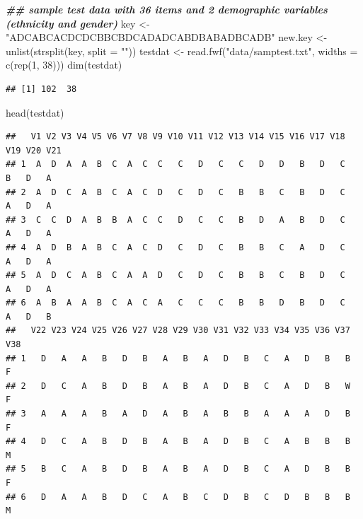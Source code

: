 \documentclass[
]{book}
\newenvironment{Shaded}{\begin{snugshade}}{\end{snugshade}}
\newcommand{\AttributeTok}[1]{\textcolor[rgb]{0.77,0.63,0.00}{#1}}
\newcommand{\DecValTok}[1]{\textcolor[rgb]{0.00,0.00,0.81}{#1}}
\newcommand{\DocumentationTok}[1]{\textcolor[rgb]{0.56,0.35,0.01}{\textbf{\textit{#1}}}}
\newcommand{\FunctionTok}[1]{\textcolor[rgb]{0.00,0.00,0.00}{#1}}
\newcommand{\NormalTok}[1]{#1}
\newcommand{\OtherTok}[1]{\textcolor[rgb]{0.56,0.35,0.01}{#1}}
\newcommand{\StringTok}[1]{\textcolor[rgb]{0.31,0.60,0.02}{#1}}
\begin{document}
\begin{Shaded}
\begin{Highlighting}[]
\DocumentationTok{\#\# sample test data with 36 items and 2 demographic variables (ethnicity and gender)}
\NormalTok{key }\OtherTok{\textless{}{-}} \StringTok{"ADCABCACDCDCBBCBDCADADCABDBABADBCADB"}
\NormalTok{new.key }\OtherTok{\textless{}{-}} \FunctionTok{unlist}\NormalTok{(}\FunctionTok{strsplit}\NormalTok{(key, }\AttributeTok{split =} \StringTok{""}\NormalTok{))}
\NormalTok{testdat }\OtherTok{\textless{}{-}} \FunctionTok{read.fwf}\NormalTok{(}\StringTok{"data/samptest.txt"}\NormalTok{, }\AttributeTok{widths =} \FunctionTok{c}\NormalTok{(}\FunctionTok{rep}\NormalTok{(}\DecValTok{1}\NormalTok{, }\DecValTok{38}\NormalTok{)))}
\FunctionTok{dim}\NormalTok{(testdat)}
\end{Highlighting}
\end{Shaded}

\begin{verbatim}
## [1] 102  38
\end{verbatim}

\begin{Shaded}
\begin{Highlighting}[]
\FunctionTok{head}\NormalTok{(testdat)}
\end{Highlighting}
\end{Shaded}

\begin{verbatim}
##   V1 V2 V3 V4 V5 V6 V7 V8 V9 V10 V11 V12 V13 V14 V15 V16 V17 V18 V19 V20 V21
## 1  A  D  A  A  B  C  A  C  C   C   D   C   C   D   D   B   D   C   B   D   A
## 2  A  D  C  A  B  C  A  C  D   C   D   C   B   B   C   B   D   C   A   D   A
## 3  C  C  D  A  B  B  A  C  C   D   C   C   B   D   A   B   D   C   A   D   A
## 4  A  D  B  A  B  C  A  C  D   C   D   C   B   B   C   A   D   C   A   D   A
## 5  A  D  C  A  B  C  A  A  D   C   D   C   B   B   C   B   D   C   A   D   A
## 6  A  B  A  A  B  C  A  C  A   C   C   C   B   B   D   B   D   C   A   D   B
##   V22 V23 V24 V25 V26 V27 V28 V29 V30 V31 V32 V33 V34 V35 V36 V37 V38
## 1   D   A   A   B   D   B   A   B   A   D   B   C   A   D   B   B   F
## 2   D   C   A   B   D   B   A   B   A   D   B   C   A   D   B   W   F
## 3   A   A   A   B   A   D   A   B   A   B   B   A   A   A   D   B   F
## 4   D   C   A   B   D   B   A   B   A   D   B   C   A   B   B   B   M
## 5   B   C   A   B   D   B   A   B   A   D   B   C   A   D   B   B   F
## 6   D   A   A   B   D   C   A   B   C   D   B   C   D   B   B   B   M
\end{verbatim}
\end{document}
